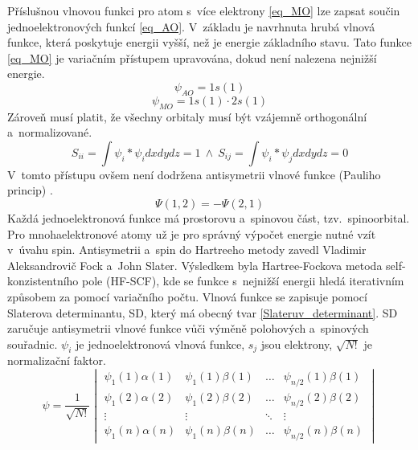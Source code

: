 \documentclass[
  printed, %
  table,   %
  lof,     %
  lot,     %
  oneside,
]{fithesis3}
\begin{document}
Příslušnou vlnovou funkci pro atom s~více elektrony \ref{eq_MO} lze zapsat součin jednoelektronových funkcí \ref{eq_AO}.  V~základu je navrhnuta hrubá vlnová funkce, která poskytuje energii vyšší, než je energie základního stavu. Tato funkce \ref{eq_MO} je variačním přístupem upravována, dokud není nalezena nejnižší energie.  
\begin{equation}
\psi_{AO} = 1s(1)
\label{eq_AO}
\end{equation}
\begin{equation}
\psi_{MO} = 1s(1) \cdot 2s(1)
\label{eq_MO}
\end{equation} 
Zároveň musí platit, že všechny orbitaly musí být vzájemně orthogonální a~normalizované.
\begin{equation}
S_{ii} = \int \psi_i * \psi_i dx dy dz = 1 ~ \wedge ~ S_{ij} = \int \psi_i * \psi_j dx dy dz = 0
\end{equation}
V~tomto přístupu ovšem není dodržena antisymetrii vlnové funkce (Pauliho princip) \cite{warren1986ab}.
\begin{equation}
\Psi (1,2) = - \Psi (2,1)
\label{Paulliho_princip}
\end{equation}
 Každá jednoelektronová funkce má prostorovu a~spinovou část, tzv.~spinoorbital. Pro mnohaelektronové atomy už je pro správný výpočet energie nutné vzít v~úvahu spin.  Antisymetrii a~spin do Hartreeho metody zavedl Vladimir Aleksandrovič Fock a~John Slater. Výsledkem byla Hartree-Fockova metoda self-konzistentního pole (HF-SCF), kde se funkce s~nejnižší energii hledá iterativním způsobem za pomocí variačního počtu. Vlnová funkce se zapisuje pomocí Slaterova determinantu, SD, který má obecný tvar \ref{Slateruv_determinant}. SD zaručuje antisymetrii vlnové funkce vůči výměně polohových a~spinových souřadnic. $\psi_i$ je jednoelektronová vlnová funkce, $s_j$ jsou elektrony, $\sqrt{N!}$ je normalizační faktor.
\begin{equation}
\psi =  \frac{1}{\sqrt{N!}}\begin{vmatrix}
\psi_1(1)\alpha(1) & \psi_1(1) \beta (1)  & \dots & \psi_{n/2}(1)\beta(1) \\
\psi_1(2)\alpha(2) & \psi_1(2) \beta (2) & \dots & \psi_{n/2}(2)\beta(2) \\
\vdots             & \vdots                           & \ddots & \vdots \\
\psi_1(n)\alpha(n) & \psi_1(n) \beta (n) & \dots & \psi_{n/2}(n)\beta(n) 
\end{vmatrix}
\label{Slateruv_determinant}
\end{equation}
\end{document}
